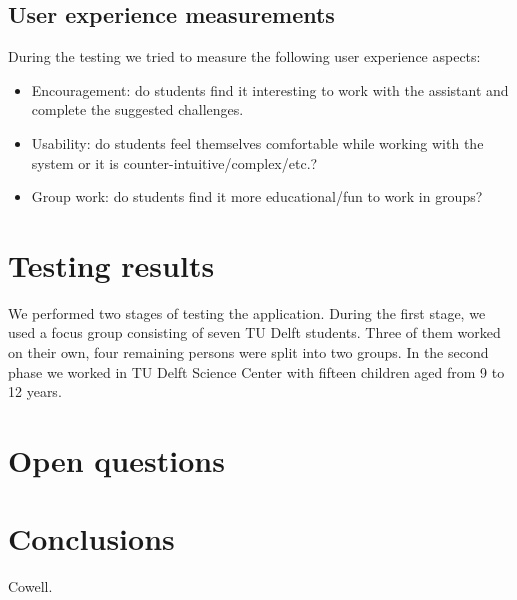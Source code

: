 \documentclass[a4paper]{article}
\begin{document}
\subsection{User experience measurements}

During the testing we tried to measure the following user experience aspects:

\begin{itemize}
	\item Encouragement: do students find it interesting to work with the assistant and complete the suggested challenges.
	\item Usability: do students feel themselves comfortable while working with the system or it is counter-intuitive/complex/etc.?
	\item Group work: do students find it more educational/fun to work in groups? 
\end{itemize}

\section{Testing results}

We performed two stages of testing the application. During the first stage, we used a focus group consisting of seven TU Delft students. Three of them worked on their own, four remaining persons were split into two groups. In the second phase we worked in TU Delft Science Center with fifteen children aged from 9 to 12 years.



\section{Open questions}


\section{Conclusions}

\begin{thebibliography}{99}
 Cowell.
\end{thebibliography}
\end{document}
